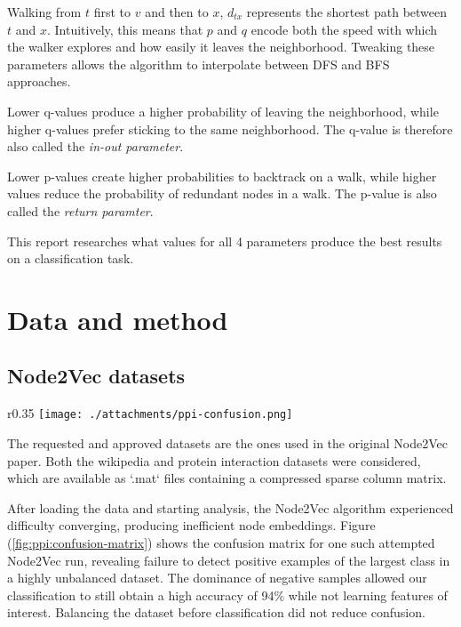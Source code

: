 \documentclass[a4paper,10pt]{article}
\begin{document}
Walking from $t$ first to $v$ and then to $x$, $d_{tx}$ represents the shortest path between $t$ and $x$. Intuitively, this means that $p$ and $q$ encode both the speed with which the walker explores and how easily it leaves the neighborhood. Tweaking these parameters allows the algorithm to interpolate between DFS and BFS approaches.

Lower q-values produce a higher probability of leaving the neighborhood, while higher q-values prefer sticking to the same neighborhood. The q-value is therefore also called the \textit{in-out parameter}.

Lower p-values create higher probabilities to backtrack on a walk, while higher values reduce the probability of redundant nodes in a walk. The p-value is also called the \textit{return paramter}.

This report researches what values for all 4 parameters produce the best results on a classification task.

\section{Data and method}

\subsection{Node2Vec datasets}

\begin{wrapfigure}{r}{0.35\textwidth}
  \centering
  \vspace{-8mm}
      \texttt{[image: ./attachments/ppi-confusion.png]}
        \caption{Confusion matrix for PPI dataset}
        \label{fig:ppi:confusion-matrix}
\end{wrapfigure}

The requested and approved datasets are the ones used in the original Node2Vec paper. Both the wikipedia and protein interaction datasets were considered, which are available as `.mat` files containing a compressed sparse column matrix.

After loading the data and starting analysis, the Node2Vec algorithm experienced difficulty converging, producing inefficient node embeddings. Figure (\ref{fig:ppi:confusion-matrix}) shows the confusion matrix for one such attempted Node2Vec run, revealing failure to detect positive examples of the largest class in a highly unbalanced dataset. The dominance of negative samples allowed our classification to still obtain a high accuracy of 94\% while not learning features of interest. Balancing the dataset before classification did not reduce confusion.
\end{document}
